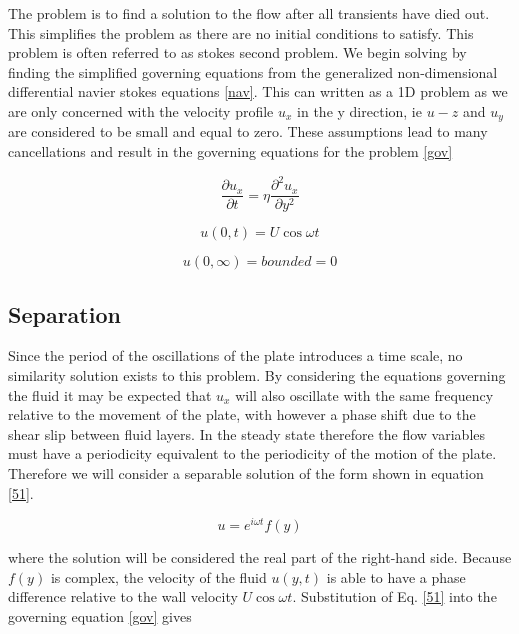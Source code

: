 \documentclass[paper=a4, fontsize=11pt, abstract=on]{scrartcl}
\numberwithin{equation}{section}		%
\numberwithin{figure}{section}			%
\numberwithin{table}{section}				%
\begin{document}
 The problem is to find a solution to the flow after all transients have died out. This simplifies the problem as there are no initial conditions to satisfy. This problem is often referred to as stokes second problem. We begin solving by finding the simplified governing equations from the generalized non-dimensional differential navier stokes equations \ref{nav}. This can written as a 1D problem as we are only concerned with the velocity profile $u_x$ in the y direction, ie $u-z$ and $u_y$ are considered to be small and equal to zero. These assumptions lead to many cancellations and result in the governing equations for the problem \ref{gov}



 \begin{equation}
\label{gov}
\frac{\partial u_x}{\partial t} = \eta \frac{\partial^2 u_x}{\partial y^2}
\end{equation} 




 \begin{equation}
\label{b1}
u(0,t) = U\cos \omega t
\end{equation}

 
  \begin{equation}
\label{b2}
u(0,\infty) = bounded = 0
\end{equation}

\subsection{Separation}
Since the period of the oscillations of the plate introduces a time scale, no similarity solution exists to this problem. By considering the equations governing the fluid it may be expected that $u_x$ will also oscillate with the same frequency relative to the movement of the plate, with however a phase shift due to the shear slip between fluid layers. In the steady state therefore the flow variables must have a periodicity equivalent to the periodicity of the motion of the plate. Therefore we will consider a separable solution of the form shown in equation \ref{51}.

 \begin{equation}
\label{51}
u = e^{i\omega t}f(y)
\end{equation}


where the solution will be considered the real part of the right-hand side. Because $f(y)$ is complex, the velocity of the fluid $u(y,t)$ is able to have a phase difference relative to the wall velocity $U\cos \omega t$. Substitution of Eq. \ref{51} into the governing equation \ref{gov} gives
\end{document}
